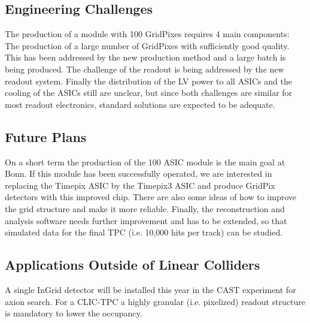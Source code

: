 \subsection{Engineering Challenges}
The production of a module with 100 GridPixes requires 4 main components: The production of a
large number of GridPixes with sufficiently good quality. This has been addressed by the new production method and a large batch is being produced. The challenge of the readout is being addressed by the new readout system. Finally the distribution of the LV power to all ASICs and the cooling of the ASICs still are unclear, but since both challenges are similar for most readout electronics, standard solutions are expected to be adequate.

\subsection{Future Plans}
On a short term the production of the 100 ASIC module is the main goal at Bonn. If this module has been successfully operated, we are interested in replacing the Timepix ASIC by the Timepix3 ASIC and produce GridPix detectors with this improved chip. There are also some ideas of how to improve the grid structure and make it more reliable. Finally, the reconstruction and analysis software needs further improvement and has to be extended, so that simulated data for the final TPC (i.e. 10,000 hits per track) can be studied.

\subsection{Applications Outside of Linear Colliders}
A single InGrid detector will be installed this year in the CAST experiment for axion search. For a CLIC-TPC a highly granular (i.e. pixelized) readout structure is mandatory to lower the occupancy.
